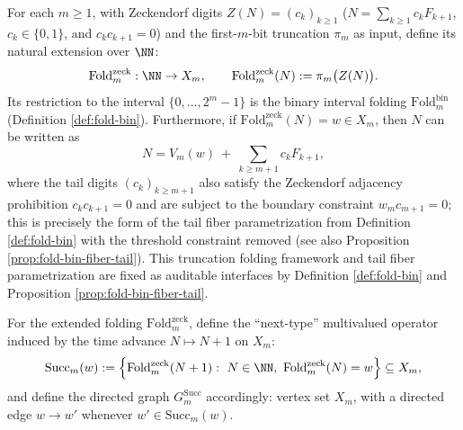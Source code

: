 \begin{enumerate}
  \begin{definition}\label{def:terminal-fold-zeck-extension}
  For each \(m\ge 1\), with Zeckendorf digits \(Z(N)=(c_k)_{k\ge 1}\) (\(N=\sum_{k\ge 1}c_kF_{k+1}\), \(c_k\in\{0,1\}\), and \(c_kc_{k+1}=0\)) and the first-\(m\)-bit truncation \(\pi_m\) as input, define its natural extension over \(\NN\):
  \[
  \mathrm{Fold}^{\mathrm{zeck}}_m:\NN\to X_m,\qquad
  \mathrm{Fold}^{\mathrm{zeck}}_m(N):=\pi_m\bigl(Z(N)\bigr).
  \]
  Its restriction to the interval \(\{0,\dots,2^m-1\}\) is the binary interval folding \(\mathrm{Fold}^{\mathrm{bin}}_m\) (Definition \ref{def:fold-bin}).
  Furthermore, if \(\mathrm{Fold}^{\mathrm{zeck}}_m(N)=w\in X_m\), then \(N\) can be written as
  \[
  N=V_m(w)\ +\ \sum_{k\ge m+1} c_kF_{k+1},
  \]
  where the tail digits \((c_k)_{k\ge m+1}\) also satisfy the Zeckendorf adjacency prohibition \(c_kc_{k+1}=0\) and are subject to the boundary constraint \(w_m c_{m+1}=0\); this is precisely the form of the tail fiber parametrization from Definition \ref{def:fold-bin} with the threshold constraint removed (see also Proposition \ref{prop:fold-bin-fiber-tail}).
  This truncation folding framework and tail fiber parametrization are fixed as auditable interfaces by Definition \ref{def:fold-bin} and Proposition \ref{prop:fold-bin-fiber-tail}.
  \end{definition}

  \begin{definition}\label{def:terminal-succ-m}
  For the extended folding \(\mathrm{Fold}^{\mathrm{zeck}}_m\), define the ``next-type'' multivalued operator induced by the time advance \(N\mapsto N+1\) on \(X_m\):
  \[
  \mathrm{Succ}_m(w):=\Bigl\{\mathrm{Fold}^{\mathrm{zeck}}_m(N+1):\ N\in\NN,\ \mathrm{Fold}^{\mathrm{zeck}}_m(N)=w\Bigr\}\subseteq X_m,
  \]
  and define the directed graph \(G^{\mathrm{Succ}}_m\) accordingly: vertex set \(X_m\), with a directed edge \(w\to w'\) whenever \(w'\in\mathrm{Succ}_m(w)\).
  \end{definition}


\end{enumerate}
